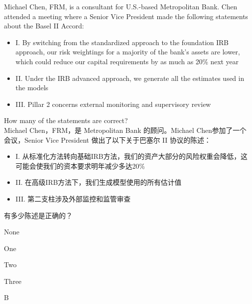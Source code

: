 \documentclass{article}
\newcounter{question} %
\begin{document}
\begin{question}
    Michael Chen, FRM, is a consultant for U.S.-based Metropolitan Bank. Chen attended a meeting where a Senior Vice President made the following statements about the Basel II Accord:
    \begin{itemize}
    \item I. By switching from the standardized approach to the foundation IRB approach, our risk weightings for a majority of the bank's assets are lower, which could reduce our capital requirements by as much as 20\% next year
    \item II. Under the IRB advanced approach, we generate all the estimates used in the models
    \item III. Pillar 2 concerns external monitoring and supervisory review
    \end{itemize}
    How many of the statements are correct?
    \\Michael Chen，FRM，是 Metropolitan Bank 的顾问。Michael Chen参加了一个会议，Senior Vice President 做出了以下关于巴塞尔 II 协议的陈述：
    \begin{itemize}
    \item I. 从标准化方法转向基础IRB方法，我们的资产大部分的风险权重会降低，这可能会使我们的资本要求明年减少多达20\%
    \item II. 在高级IRB方法下，我们生成模型使用的所有估计值
    \item III. 第二支柱涉及外部监控和监管审查
    \end{itemize}
    有多少陈述是正确的？
\end{question}

\begin{choices}
    \item None
    \item One
    \item Two
    \item Three
\end{choices}

\begin{correctanswer}
    B
\end{correctanswer}
\end{document}
